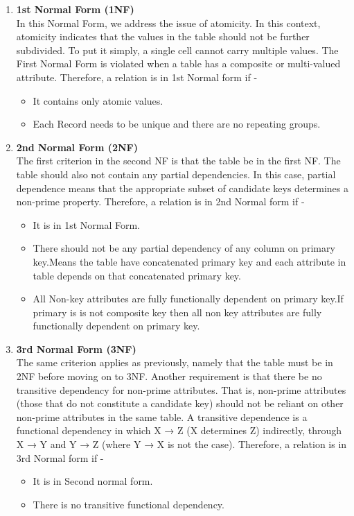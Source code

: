 \begin{enumerate}
\item \textbf{1st Normal Form (1NF)}\\
In this Normal Form, we address the issue of atomicity. In this context, atomicity indicates that the values in the table should not be further subdivided. To put it simply, a single cell cannot carry multiple values. The First Normal Form is violated when a table has a composite or multi-valued attribute. Therefore, a relation is in 1st Normal form if -
\begin{itemize}
\item It contains only atomic values.
\item Each Record needs to be unique and there are no repeating groups.
\end{itemize}

\item \textbf{2nd Normal Form (2NF)}\\
The first criterion in the second NF is that the table be in the first NF. The table should also not contain any partial dependencies. In this case, partial dependence means that the appropriate subset of candidate keys determines a non-prime property. Therefore, a relation is in 2nd Normal form if -
\begin{itemize}
\item It is in 1st Normal Form.
\item There should not be any partial dependency of any column on primary key.Means the table have concatenated primary key and each attribute in table depends on that concatenated primary key.
\item All Non-key attributes are fully functionally dependent on primary key.If primary is is not composite key then all non key attributes are fully functionally dependent on primary key.
\end{itemize}

\item \textbf{3rd Normal Form (3NF)}\\
The same criterion applies as previously, namely that the table must be in 2NF before moving on to 3NF. Another requirement is that there be no transitive dependency for non-prime attributes. That is, non-prime attributes (those that do not constitute a candidate key) should not be reliant on other non-prime attributes in the same table. A transitive dependence is a functional dependency in which X → Z (X determines Z) indirectly, through X → Y and Y → Z (where Y → X is not the case). Therefore, a relation is in 3rd Normal form if -
\begin{itemize}
\item It is in Second normal form.
\item There is no transitive functional dependency.
\end{itemize}


\end{enumerate}
